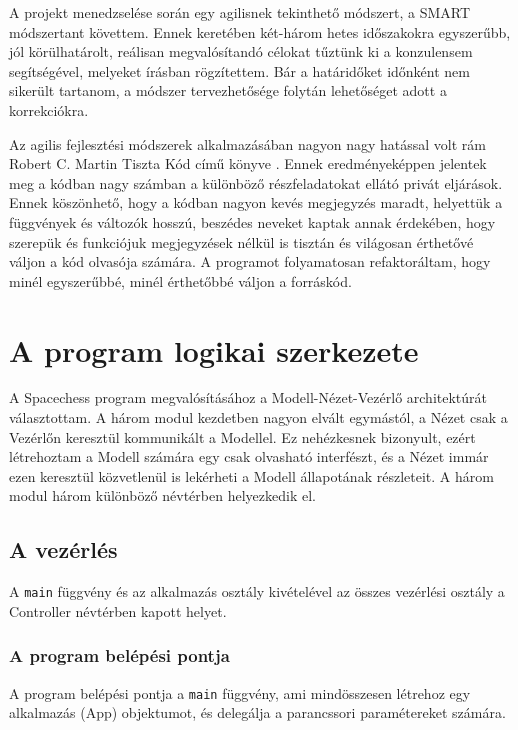 \documentclass[12pt, twoside]{report}
\begin{document}
A projekt menedzselése során egy agilisnek tekinthető módszert, a SMART módszertant követtem. Ennek keretében két-három hetes időszakokra egyszerűbb, jól körülhatárolt, reálisan megvalósítandó célokat tűztünk ki a konzulensem segítségével, melyeket írásban rögzítettem. Bár a határidőket időnként nem sikerült tartanom, a módszer tervezhetősége folytán lehetőséget adott a korrekciókra.

Az agilis fejlesztési módszerek alkalmazásában nagyon nagy hatással volt rám Robert C. Martin Tiszta Kód című könyve \cite{cleancode}. Ennek eredményeképpen jelentek meg a kódban nagy számban a különböző részfeladatokat ellátó privát eljárások. Ennek köszönhető, hogy a kódban nagyon kevés megjegyzés maradt, helyettük a függvények és változók hosszú, beszédes neveket kaptak annak érdekében, hogy szerepük és funkciójuk megjegyzések nélkül is tisztán és világosan érthetővé váljon a kód olvasója számára. A programot folyamatosan refaktoráltam, hogy minél egyszerűbbé, minél érthetőbbé váljon a forráskód.

\section{A program logikai szerkezete}

A Spacechess program megvalósításához a Modell-Nézet-Vezérlő architektúrát választottam. A három modul kezdetben nagyon elvált egymástól, a Nézet csak a Vezérlőn keresztül kommunikált a Modellel. Ez nehézkesnek bizonyult, ezért létrehoztam a Modell számára egy csak olvasható interfészt, és a Nézet immár ezen keresztül közvetlenül is lekérheti a Modell állapotának részleteit. A három modul három különböző névtérben helyezkedik el.

\subsection{A vezérlés}

A {\tt main} függvény és az alkalmazás osztály kivételével az összes vezérlési osztály a Controller névtérben kapott helyet.

\subsubsection{A program belépési pontja}

A program belépési pontja a {\tt main} függvény, ami mindösszesen létrehoz egy alkalmazás (App) objektumot, és delegálja a parancssori paramétereket számára.
\end{document}
